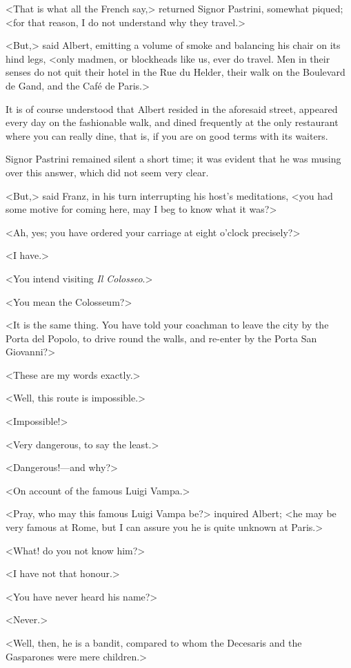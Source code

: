  <That is what all the French say,> returned Signor Pastrini, somewhat piqued; <for that reason, I do not understand why they travel.> 

 <But,> said Albert, emitting a volume of smoke and balancing his chair on its hind legs, <only madmen, or blockheads like us, ever do travel. Men in their senses do not quit their hotel in the Rue du Helder, their walk on the Boulevard de Gand, and the Café de Paris.> 

 It is of course understood that Albert resided in the aforesaid street, appeared every day on the fashionable walk, and dined frequently at the only restaurant where you can really dine, that is, if you are on good terms with its waiters. 

 Signor Pastrini remained silent a short time; it was evident that he was musing over this answer, which did not seem very clear. 

 <But,> said Franz, in his turn interrupting his host's meditations, <you had some motive for coming here, may I beg to know what it was?>

<Ah, yes; you have ordered your carriage at eight o'clock precisely?> 

 <I have.> 

 <You intend visiting \textit{Il Colosseo}.> 

 <You mean the Colosseum?> 

 <It is the same thing. You have told your coachman to leave the city by the Porta del Popolo, to drive round the walls, and re-enter by the Porta San Giovanni?> 

 <These are my words exactly.> 

 <Well, this route is impossible.> 

 <Impossible!> 

 <Very dangerous, to say the least.> 

 <Dangerous!—and why?> 

 <On account of the famous Luigi Vampa.> 

 <Pray, who may this famous Luigi Vampa be?> inquired Albert; <he may be very famous at Rome, but I can assure you he is quite unknown at Paris.> 

 <What! do you not know him?> 

 <I have not that honour.> 

 <You have never heard his name?> 

 <Never.> 

 <Well, then, he is a bandit, compared to whom the Decesaris and the Gasparones were mere children.> 

